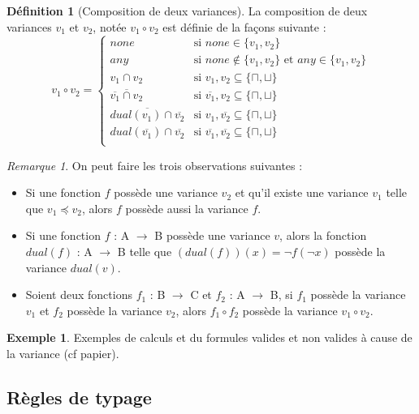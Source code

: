 \documentclass{rapport}
\theoremstyle{plain}
\theoremstyle{remark}
\newtheorem{rema}{Remarque}
\theoremstyle{definition}
\newtheorem{dfn}{Définition}
\newtheorem{exem}{Exemple}
\begin{document}
\begin{dfn} [Composition de deux variances] La composition de deux variances $v_1$ et $v_2$, notée $v_1 \circ v_2$ est définie de la façons suivante : 
\[v_1 \circ v_2 = \left\{
\begin{array}{ll}
none & \text{si }none \in \{v_1, v_2\}\\
any & \text{si }none \notin \{v_1, v_2\} \text{ et } any \in \{v_1, v_2\}\\
v_1 \cap v_2 & \text{si }v_1, v_2 \subseteq \{\sqcap, \sqcup\}\\
\overline{\overline{v_1} \cap v_2} & \text{si }\overline{v_1}, v_2 \subseteq \{\sqcap, \sqcup\}\\
\overline{dual(v_1) \cap \overline{v_2}} & \text{si }v_1, \overline{v_2} \subseteq \{\sqcap, \sqcup\}\\
dual(\overline{v_1}) \cap \overline{v_2} & \text{si }\overline{v_1}, \overline{v_2} \subseteq \{\sqcap, \sqcup\}\\
\end{array}\right.\]
\end{dfn}

\begin{rema} On peut faire les trois observations suivantes :
\begin{itemize}
	\item Si une fonction $f$ possède une variance $v_2$ et qu'il existe une variance $v_1$ telle que $v_1 \preccurlyeq v_2$, alors $f$ possède aussi la variance $f$.
	\item Si une fonction $f$ : A $\rightarrow$ B possède une variance $v$, alors la fonction $dual(f)$ : A $\rightarrow$ B telle que $(dual(f))(x) = \neg f(\neg x)$ possède la variance $dual(v)$.
	\item Soient deux fonctions $f_1$ : B $\rightarrow$ C et $f_2$ : A $\rightarrow$ B, si $f_1$ possède la variance $v_1$ et $f_2$ possède la variance $v_2$, alors $f_1 \circ f_2$ possède la variance $v_1 \circ v_2$.
\end{itemize}
\end{rema}

\begin{exem}
Exemples de calculs et du formules valides et non valides à cause de la variance (cf papier).
\end{exem}

\subsection{Règles de typage\label{regles}}
\end{document}
